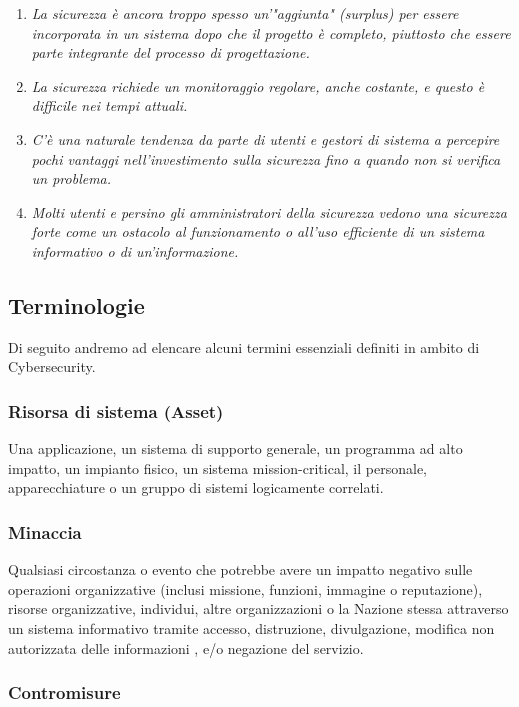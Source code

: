 \begin{enumerate}
      \item \textit{La sicurezza è ancora troppo spesso un'"aggiunta" (surplus) per essere incorporata in un sistema dopo che il progetto è completo, piuttosto che essere parte integrante del processo di progettazione.}
      \item \textit{La sicurezza richiede un monitoraggio regolare, anche costante, e questo è difficile nei tempi attuali.}
      \item \textit{C'è una naturale tendenza da parte di utenti e gestori di sistema a percepire pochi vantaggi nell'investimento sulla sicurezza fino a quando non si verifica un problema.}
      \item \textit{ Molti utenti e persino gli amministratori della sicurezza vedono una sicurezza forte come un ostacolo al funzionamento o all'uso efficiente di un sistema informativo o di un'informazione.}
\end{enumerate}

\subsection{Terminologie}

Di seguito andremo ad elencare alcuni termini essenziali definiti in ambito di Cybersecurity.

\subsubsection{Risorsa di sistema (Asset)}

Una applicazione, un sistema di supporto generale, un programma ad alto
impatto, un impianto fisico, un sistema
mission-critical, il personale, apparecchiature o un gruppo di sistemi logicamente
correlati.

\subsubsection{Minaccia}

Qualsiasi circostanza o evento che potrebbe avere un impatto negativo sulle
operazioni organizzative
(inclusi missione, funzioni, immagine o reputazione), risorse organizzative,
individui, altre organizzazioni o la
Nazione stessa attraverso un sistema informativo tramite accesso, distruzione,
divulgazione, modifica non autorizzata
delle informazioni , e/o negazione del servizio.

\subsubsection{Contromisure}

